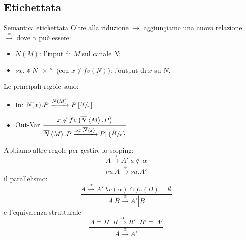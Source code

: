 \subsection{Etichettata}

\begin{frame}{Semantica etichettata}
  Oltre alla riduzione $\rightarrow$ aggiungiamo una nuova relazione
  $\xrightarrow{\alpha}$ dove $\alpha$ pu\`o essere:
  \begin{itemize}
  \item $N(M)$: l'input di $M$ sul canale $N$;
  \item $\nu x.\obar{N}\ang{x}$ (con $x\not\in fv(N)$): l'output di
    $x$ su $N$.
  \end{itemize}
  
  Le principali regole sono:
  \begin{itemize}
  \item In: \( N(x).P \xrightarrow{N(M)} P\left[\sfrac{M}{x}\right] \)
  \item Out-Var \( \displaystyle \frac{x\not\in
      fv\left(\overline{N}\left<M\right>.P\right)}{\overline{N}\left<M\right>.P \xrightarrow{\nu
        x.\overline{N}\left<x\right>} P|\left\{\sfrac{M}{x}\right\}} \)
  \end{itemize}

\end{frame}

\begin{frame}
  Abbiamo altre regole per gestire lo scoping:
  \[ \frac{A \xrightarrow{\alpha} A'\; u\not\in\alpha}{\nu u.A
      \xrightarrow{\alpha} \nu u.A'} \]
  il parallelismo:
  \[ \frac{A \xrightarrow{\alpha} A'\;bv(\alpha) \cap fv(B) =
      \emptyset}{A|B \xrightarrow{\alpha} A'|B} \]
  e l'equivalenza strutturale:
  \[ \frac{A \equiv B\;\; B\xrightarrow{\alpha} B'\;\; B' \equiv A'}{A
      \xrightarrow{\alpha} A'} \]
\end{frame}

